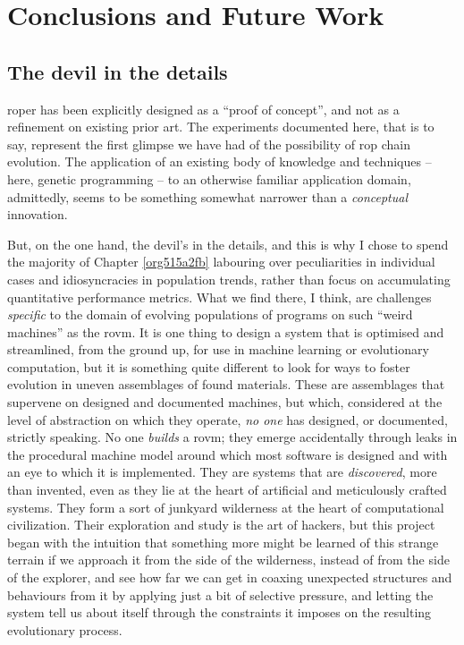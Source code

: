 \documentclass[12pt,glossary]{dalthesis}
\begin{document}
\chapter{Conclusions and Future Work}
\label{sec:org0ea64a3}
\label{org7698105}

\section{The devil in the details}
\label{sec:orgdd2eab1}

\Gls{roper} has been explicitly designed as a ``proof of concept'', and not
as a refinement on existing prior art. The experiments documented here,
that is to say, represent the first glimpse we have had of the possibility
of \gls{rop} chain evolution. The application of an existing body of knowledge
and techniques -- here, genetic programming -- to an otherwise familiar
application domain, admittedly, seems to be something somewhat narrower than
a \emph{conceptual} innovation. 

But, on the one hand, the devil's in the details, and this is why I chose to
spend the majority of Chapter \ref{org515a2fb} labouring over peculiarities
in individual cases and idiosyncracies in population trends, rather than focus
on accumulating quantitative performance metrics. What we find there, I think,
are challenges \emph{specific} to the domain of evolving populations of programs on
such ``weird machines'' as the \gls{rovm}. It is one thing to design a system that
is optimised and streamlined, from the ground up, for use in machine learning
or evolutionary computation, but it is something quite different to look for
ways to foster evolution in uneven assemblages of found materials. These are
assemblages that supervene on designed and documented machines, but which,
considered at the level of abstraction on which they operate, \emph{no one} has
designed, or documented, strictly speaking. No one \emph{builds} a \gls{rovm}; they
emerge accidentally through leaks in the procedural machine model around which
most software is designed and with an eye to which it is implemented. They
are systems that are \emph{discovered}, more than invented, even as they lie at
the heart of artificial and meticulously crafted systems. They form a sort
of junkyard wilderness at the heart of computational civilization. Their
exploration and study is the art of hackers, but this project began with the
intuition that something more might be learned of this strange terrain if
we approach it from the side of the wilderness, instead of from the side of
the explorer, and see how far we can get in coaxing unexpected structures 
and behaviours from it by applying just a bit of selective pressure, and
letting the system tell us about itself through the constraints it imposes 
on the resulting evolutionary process. 
\end{document}
